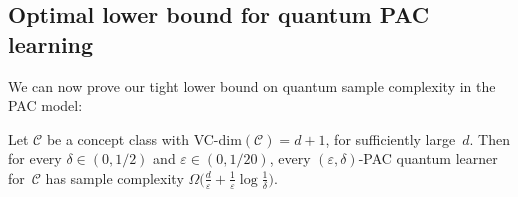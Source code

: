 \documentclass[twoside,11pt]{article}
\newcommand{\eps}{\varepsilon}
\newcommand{\C}{\ensuremath{\mathscr{C}}}
\begin{document}
\subsection{Optimal lower bound for quantum PAC learning}
\label{section:optimalpaclowerbounds}

We can now prove our tight lower bound on quantum sample complexity in the PAC model:

\begin{theorem}
	\label{thm:optimalpaclowerbound}
	Let $\C$ be a concept class with VC-dim$(\C)=d+1$, for sufficiently large~$d$. Then for every $\delta\in (0,1/2)$ and $\eps \in (0,1/20)$, every $(\eps,\delta)$-PAC quantum learner for~$\C$ has sample complexity 
	$\Omega\Big(\frac{d}{\eps} + \frac{1}{\eps}\log \frac{1}{\delta}\Big)$.
\end{theorem}
\end{document}
